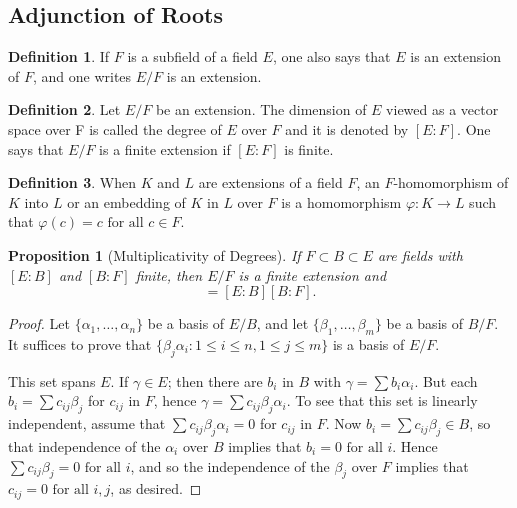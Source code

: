\documentclass[draft]{article}
\newtheorem{prop}[thm]{Proposition}
\theoremstyle{definition}
\newtheorem{defn}{Definition}[section]
\theoremstyle{remark}
\begin{document}
		\subsection{Adjunction of Roots}
		
			\begin{defn}
				If $F$ is a subfield of a field $E$, one also says that $E$ is an extension of $F$, and one writes $E/F$ is an extension.
			\end{defn}
			
			\begin{defn}
				Let $E/F$ be an extension. The dimension of $E$ viewed as a vector space over F is called the degree of $E$ over $F$ and it is denoted by $[E : F]$. One says that $E/F$ is a finite extension if $[E : F]$ is finite.
			\end{defn}
			
			\begin{defn}
			    When $K$ and $L$ are extensions of a field $F$, an $F$-homomorphism of $K$ into $L$ or an embedding of $K$ in $L$ over $F$ is a homomorphism $\varphi: K \to L$ such that $\varphi(c) = c \text{ for all } c \in F$. 
			\end{defn}
			
			\begin{prop}[Multiplicativity of Degrees]
				If $F \subset B \subset E$ are fields with $[E : B]$ and $[B : F]$ finite, then $E/F$ is a finite extension and
				\begin{equation*}
					[E : F] = [E : B][B : F].
				\end{equation*}
			\end{prop}
			
			\begin{proof}
				Let $\{\alpha_1, \dots, \alpha_n\}$ be a basis of $E/B$, and let $\{\beta_1, \dots, \beta_m\}$ be a basis of $B/F$. It suffices to prove that $\{\beta_j\alpha_i : 1 \leq i \leq n, 1 \leq j \leq m\}$ is a basis of $E/F$.\par
				This set spans $E$. If $\gamma \in E$; then there are $b_i$ in $B$ with $\gamma = \sum{b_i\alpha_i}$. But each $b_i = \sum{c_{ij}\beta_j}$ for $c_{ij}$ in $F$, hence $\gamma = \sum{c_{ij}\beta_j\alpha_i}$. To see that this set is linearly independent, assume that $\sum{c_{ij}\beta_j\alpha_i} = 0$ for $c_{ij}$ in $F$. Now $b_i = \sum{c_{ij}\beta_j} \in B$, so that independence of the $\alpha_i$ over $B$ implies that $b_i = 0 \text{ for all } i$. Hence $\sum{c_{ij}\beta_j} = 0 \text{ for all } i$, and so the independence of the $\beta_j$ over $F$ implies that $c_{ij} = 0 \text{ for all } i, j$, as desired.
			\end{proof}
			
\end{document}
